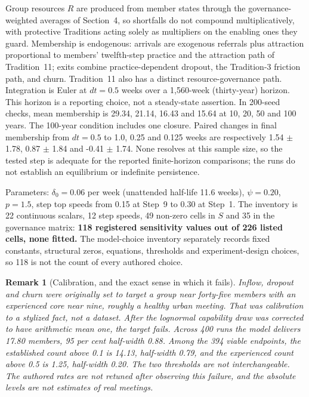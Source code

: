 \documentclass[11pt,a4paper]{article}
\newtheorem{remark}{Remark}
\begin{document}
Group resources $R$ are produced from member states through the governance-weighted
averages of Section~4, so shortfalls do not compound multiplicatively, with
protective Traditions acting solely as multipliers on the enabling ones they
guard. Membership is endogenous: arrivals are exogenous referrals plus attraction
proportional to members' twelfth-step practice and the attraction path of
Tradition~11; exits combine practice-dependent dropout, the Tradition-3 friction
path, and churn. Tradition~11 also has a distinct resource-governance path.
Integration is Euler at $dt = 0.5$ weeks over a 1,560-week (thirty-year) horizon.
This horizon is a reporting choice, not a steady-state assertion. In 200-seed
checks, mean membership is 29.34, 21.14, 16.43 and 15.64 at 10, 20, 50 and 100
years. The 100-year condition includes one closure. Paired changes in final
membership from $dt=0.5$ to 1.0, 0.25 and 0.125 weeks are respectively 1.54
$\pm$ 1.78, 0.87 $\pm$ 1.84 and -0.41 $\pm$ 1.74. None resolves at this sample
size, so the tested step is adequate for the reported finite-horizon comparisons;
the runs do not establish an equilibrium or indefinite persistence.

Parameters: $\delta_0 = 0.06$ per week (unattended half-life 11.6 weeks),
$\psi = 0.20$, $p = 1.5$, step top speeds from 0.15 at Step~9 to 0.30 at Step~1.
The inventory is 22 continuous scalars, 12 step speeds, 49 non-zero cells in $S$
and 35 in the governance matrix: \textbf{118 registered sensitivity values out of
226 listed cells, none fitted.} The model-choice inventory separately records
fixed constants, structural zeros, equations, thresholds and experiment-design
choices, so 118 is not the count of every authored choice.

\begin{remark}[Calibration, and the exact sense in which it fails]
Inflow, dropout and churn were originally set to target a group near forty-five
members with an experienced core near nine, roughly a healthy urban meeting. That
was calibration to a stylized fact, not a dataset. After the lognormal capability
draw was corrected to have arithmetic mean one, the target fails. Across 400 runs
the model delivers 17.80 members, 95 per cent half-width 0.88. Among the 394 viable
endpoints, the \emph{established} count above 0.1 is 14.13, half-width 0.79, and the
\emph{experienced} count above 0.5 is 1.25, half-width 0.20. The two thresholds are
not interchangeable. The authored rates are not retuned after observing this
failure, and the absolute levels are not estimates of real meetings.
\end{remark}
\end{document}

